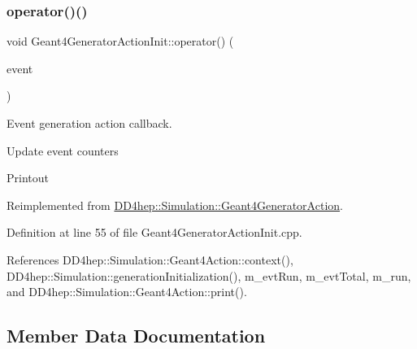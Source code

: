 \hypertarget{class_d_d4hep_1_1_simulation_1_1_geant4_generator_action_init_adbcf087dfc4c0ac510b102dfd1f838b0}{}\label{class_d_d4hep_1_1_simulation_1_1_geant4_generator_action_init_adbcf087dfc4c0ac510b102dfd1f838b0} 
\subsubsection{\texorpdfstring{operator()()}{operator()()}}
{\footnotesize\ttfamily void Geant4\+Generator\+Action\+Init\+::operator() (\begin{DoxyParamCaption}\item[{G4\+Event $\ast$}]{event }\end{DoxyParamCaption})\hspace{0.3cm}{\ttfamily [virtual]}}



Event generation action callback. 

Update event counters


\begin{DoxyItemize}
\item Printout 
\end{DoxyItemize}

Reimplemented from \hyperlink{class_d_d4hep_1_1_simulation_1_1_geant4_generator_action_ac5a1d2335a19e3f9d555081199e01801}{D\+D4hep\+::\+Simulation\+::\+Geant4\+Generator\+Action}.



Definition at line 55 of file Geant4\+Generator\+Action\+Init.\+cpp.



References D\+D4hep\+::\+Simulation\+::\+Geant4\+Action\+::context(), D\+D4hep\+::\+Simulation\+::generation\+Initialization(), m\+\_\+evt\+Run, m\+\_\+evt\+Total, m\+\_\+run, and D\+D4hep\+::\+Simulation\+::\+Geant4\+Action\+::print().



\subsection{Member Data Documentation}
\hypertarget{class_d_d4hep_1_1_simulation_1_1_geant4_generator_action_init_a4d685bb901485377aa271474ed70969b}{}\label{class_d_d4hep_1_1_simulation_1_1_geant4_generator_action_init_a4d685bb901485377aa271474ed70969b} 
